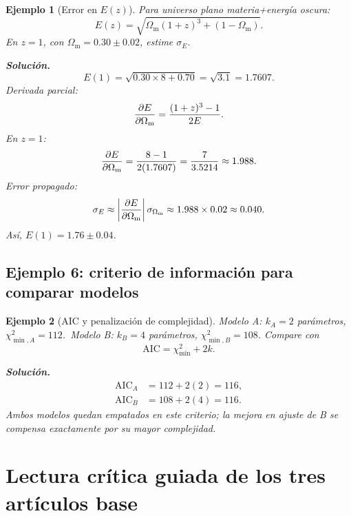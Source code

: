 \documentclass[12pt,oneside]{book}
\newtheorem{ejemplo}{Ejemplo}[chapter]
\newcommand{\OmM}{\Omega_{\mathrm{m}}}
\begin{document}
\begin{ejemplo}[Error en $E(z)$]
Para universo plano materia+energía oscura:
\begin{equation}
  E(z)=\sqrt{\OmM(1+z)^3+(1-\OmM)}.
\end{equation}
En $z=1$, con $\OmM=0.30\pm0.02$, estime $\sigma_E$.

\textbf{Solución.}
\begin{equation}
  E(1)=\sqrt{0.30\times8+0.70}=\sqrt{3.1}=1.7607.
\end{equation}
Derivada parcial:
\begin{equation}
  \pdv{E}{\OmM}=\frac{(1+z)^3-1}{2E}.
\end{equation}
En $z=1$:
\begin{equation}
  \pdv{E}{\OmM}=\frac{8-1}{2(1.7607)}=\frac{7}{3.5214}\approx1.988.
\end{equation}
Error propagado:
\begin{equation}
  \sigma_E\approx\left|\pdv{E}{\OmM}\right|\sigma_{\OmM}
  \approx1.988\times0.02\approx0.040.
\end{equation}
Así, $E(1)=1.76\pm0.04$.
\end{ejemplo}

\section{Ejemplo 6: criterio de información para comparar modelos}

\begin{ejemplo}[AIC y penalización de complejidad]
Modelo A: $k_A=2$ parámetros, $\chi^2_{\min,A}=112$.\
Modelo B: $k_B=4$ parámetros, $\chi^2_{\min,B}=108$.
Compare con
\begin{equation}
  \mathrm{AIC}=\chi^2_{\min}+2k.
\end{equation}

\textbf{Solución.}
\begin{align}
  \mathrm{AIC}_A &= 112 + 2(2)=116,\\
  \mathrm{AIC}_B &= 108 + 2(4)=116.
\end{align}
Ambos modelos quedan empatados en este criterio; la mejora en ajuste de B
se compensa exactamente por su mayor complejidad.
\end{ejemplo}

\chapter{Lectura crítica guiada de los tres artículos base}
\end{document}
